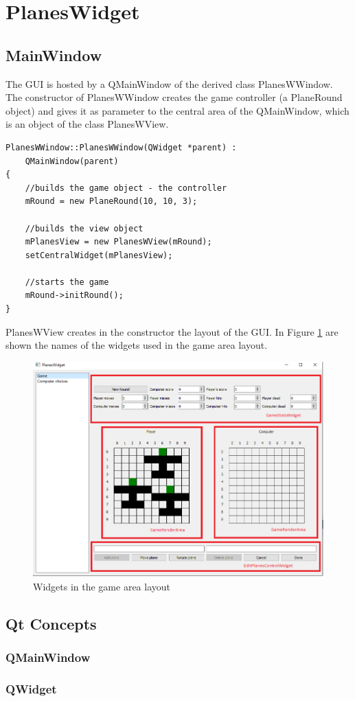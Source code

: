 \section {PlanesWidget}

\subsection{MainWindow}

The GUI is hosted by a QMainWindow of the derived class PlanesWWindow. The constructor of PlanesWWindow creates the game controller (a PlaneRound object) and gives it as parameter to the central area of the QMainWindow, which is an object of the class PlanesWView.


\begin{lstlisting}
PlanesWWindow::PlanesWWindow(QWidget *parent) :
	QMainWindow(parent)
{
	//builds the game object - the controller
	mRound = new PlaneRound(10, 10, 3);
	
	//builds the view object
	mPlanesView = new PlanesWView(mRound);
	setCentralWidget(mPlanesView);
	
	//starts the game
	mRound->initRound();
}

\end{lstlisting}

PlanesWView creates in the constructor the layout of the GUI. In Figure \ref{fig:planeswidget_game_widgetnames} are shown the names of the widgets used in the game area layout.

\begin{figure}[h]
	\includegraphics[width = \textwidth]{PlanesWidget_Game_WidgetNames.png}
	\caption{Widgets in the game area layout}
	\label{fig:planeswidget_game_widgetnames}
\end{figure}

\subsection {Qt Concepts}

\subsubsection {QMainWindow}
\subsubsection {QWidget}